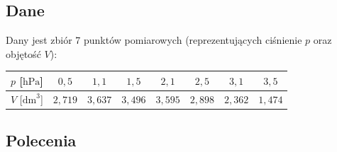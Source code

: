 \documentclass[a4paper,11pt]{article}
\begin{document}
\subsection*{Dane}

Dany jest zbiór 7 punktów pomiarowych (reprezentujących ciśnienie $p$ oraz objętość $V$):

\begin{center}
\begin{tabular}{c|ccccccc}
  \toprule
  $p$ [$\text{hPa}$] & $0{,}5$ & $1{,}1$ & $1{,}5$ & $2{,}1$ & $2{,}5$ & $3{,}1$ & $3{,}5$ \\
  \midrule
  $V$ [$\text{dm}^3$] & $2{,}719$ & $3{,}637$ & $3{,}496$ & $3{,}595$ & $2{,}898$ & $2{,}362$ & $1{,}474$ \\
  \bottomrule
\end{tabular}
\end{center}

\subsection*{Polecenia}
\end{document}
